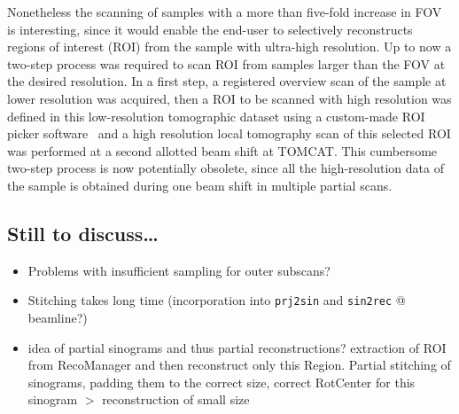 Nonetheless the scanning of samples with a more than five-fold increase in FOV is interesting, since it would enable the end-user to selectively reconstructs regions of interest (ROI) from the sample with ultra-high resolution. Up to now a two-step process was required to scan ROI from samples larger than the FOV at the desired resolution. In a first step, a registered overview scan of the sample at lower resolution was acquired, then a ROI to be scanned with high resolution was defined in this low-resolution tomographic dataset using a custom-made ROI picker software~\cite{Heinzer2008} and a high resolution local tomography scan of this selected ROI was performed at a second allotted beam shift at TOMCAT. This cumbersome two-step process is now potentially obsolete, since all the high-resolution data of the sample is obtained during one beam shift in multiple partial scans.
\cbend

\subsection{Still to discuss\ldots}
\begin{itemize}
	\item Problems with insufficient sampling for outer subscans?
	\item Stitching takes long time (incorporation into \verb+prj2sin+ and \verb+sin2rec+ @ beamline?)
	\item idea of partial sinograms and thus partial reconstructions? extraction of ROI from RecoManager and then reconstruct only this Region. Partial stitching of sinograms, padding them to the correct size, correct RotCenter for this sinogram $>$ reconstruction of small size
\end{itemize}